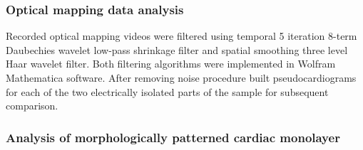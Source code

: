 \subsubsection{Optical mapping data analysis}
Recorded optical mapping videos were filtered using temporal 5 iteration 8-term Daubechies wavelet low-pass shrinkage filter and spatial smoothing three level Haar wavelet filter. Both filtering algorithms were implemented in Wolfram Mathematica software. After removing noise procedure built pseudocardiograms for each of the two electrically isolated parts of the sample for subsequent comparison. 
\subsubsection{Analysis of morphologically patterned cardiac monolayer}  
